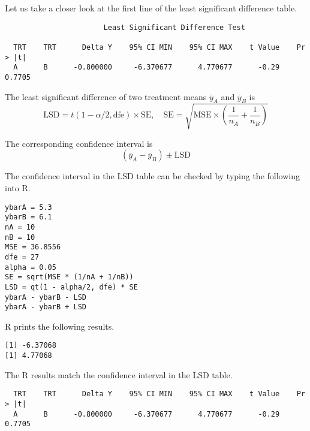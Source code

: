 \documentclass[12pt]{article}
\begin{document}
\newpage

Let us take a closer look at the first line of the least significant difference table.

{\scriptsize\begin{verbatim}
                       Least Significant Difference Test

  TRT    TRT      Delta Y    95% CI MIN    95% CI MAX    t Value    Pr > |t|  
  A      B      -0.800000     -6.370677      4.770677      -0.29      0.7705  
\end{verbatim}}

The least significant difference of two treatment means $\bar y_A$ and $\bar y_B$ is
\begin{equation*}
\text{LSD}=t(1-\alpha/2,\text{dfe})\times\text{SE},
\quad
\text{SE}=\sqrt{\text{MSE}\times\left(\frac{1}{n_A}+\frac{1}{n_B}\right)}
\end{equation*}

The corresponding confidence interval is
\begin{equation*}
(\bar y_A-\bar y_B)\pm\text{LSD}
\end{equation*}

The confidence interval in the LSD table can be checked by typing the following into R.

{\scriptsize\begin{verbatim}
ybarA = 5.3
ybarB = 6.1
nA = 10
nB = 10
MSE = 36.8556
dfe = 27
alpha = 0.05
SE = sqrt(MSE * (1/nA + 1/nB))
LSD = qt(1 - alpha/2, dfe) * SE
ybarA - ybarB - LSD
ybarA - ybarB + LSD
\end{verbatim}}

R prints the following results.

{\scriptsize\begin{verbatim}
[1] -6.37068
[1] 4.77068
\end{verbatim}}

The R results match the confidence interval in the LSD table.

{\scriptsize\begin{verbatim}
  TRT    TRT      Delta Y    95% CI MIN    95% CI MAX    t Value    Pr > |t|  
  A      B      -0.800000     -6.370677      4.770677      -0.29      0.7705  
\end{verbatim}}
\end{document}
